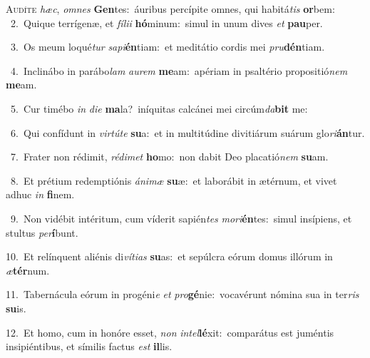 \lettrine{\initial\textcolor{\initialcolor}{A}}{udíte} \textit{hæc}\-, \textit{om}\-\textit{nes} \textbf{Gen}\-tes:~\star áuribus percípite omnes, qui habitá\textit{tis} \textbf{or}\-bem:\\
{\numbfont\textcolor{\numbcolor}{~2.}}~Quique terrígenæ, et \textit{fí}\-\textit{li}\textit{i} \textbf{hó}\-minum:~\star simul in unum dives \textit{et} \textbf{pau}\-per.\par
{\numbfont\textcolor{\numbcolor}{~3.}}~Os meum loqué\textit{tur} \textit{sa}\-\textit{pi}\textbf{én}tiam:~\star et meditátio cordis mei \textit{pru}\-\textbf{dén}tiam.\par
{\numbfont\textcolor{\numbcolor}{~4.}}~Inclinábo in parábo\textit{lam} \textit{au}\-\textit{rem} \textbf{me}\-am:~\star apériam in psaltério propositió\textit{nem} \textbf{me}\-am.\par
{\numbfont\textcolor{\numbcolor}{~5.}}~Cur timébo \textit{in} \textit{di}\-\textit{e} \textbf{ma}\-la?~\star iníquitas calcánei mei circúm\-\textit{da}\-\textbf{bit} me:\par
{\numbfont\textcolor{\numbcolor}{~6.}}~Qui confídunt in \textit{vir}\-\textit{tú}\textit{te} \textbf{su}\-a:~\star et in multitúdine divitiárum suárum glo\-\textit{ri}\-\textbf{án}tur.\par
{\numbfont\textcolor{\numbcolor}{~7.}}~Frater non rédimit, \textit{réd}\-\textit{i}\textit{met} \textbf{ho}\-mo:~\star non dabit Deo placatió\textit{nem} \textbf{su}\-am.\par
{\numbfont\textcolor{\numbcolor}{~8.}}~Et prétium redemptiónis \textit{á}\-\textit{ni}\textit{mæ} \textbf{su}\-æ:~\star et laborábit in ætérnum, et vivet adhuc \textit{in} \textbf{fi}\-nem.\par
{\numbfont\textcolor{\numbcolor}{~9.}}~Non vidébit intéritum, cum víderit sapién\textit{tes} \textit{mo}\-\textit{ri}\textbf{én}tes:~\star simul insípiens, et stultus \textit{per}\-\textbf{í}bunt.\par
{\numbfont\textcolor{\numbcolor}{10.}}~Et relínquent aliénis di\-\textit{ví}\-\textit{ti}\textit{as} \textbf{su}\-as:~\star et sepúlcra eórum domus illórum in \textit{æ}\-\textbf{tér}num.\par
{\numbfont\textcolor{\numbcolor}{11.}}~Tabernácula eórum in progéni\textit{e} \textit{et} \textit{pro}\-\textbf{gé}nie:~\star vocavérunt nómina sua in ter\textit{ris} \textbf{su}\-is.\par
{\numbfont\textcolor{\numbcolor}{12.}}~Et homo, cum in honóre esset, \textit{non} \textit{in}\-\textit{tel}\textbf{lé}xit:~\star comparátus est juméntis insipiéntibus, et símilis factus \textit{est} \textbf{il}\-lis.\par
